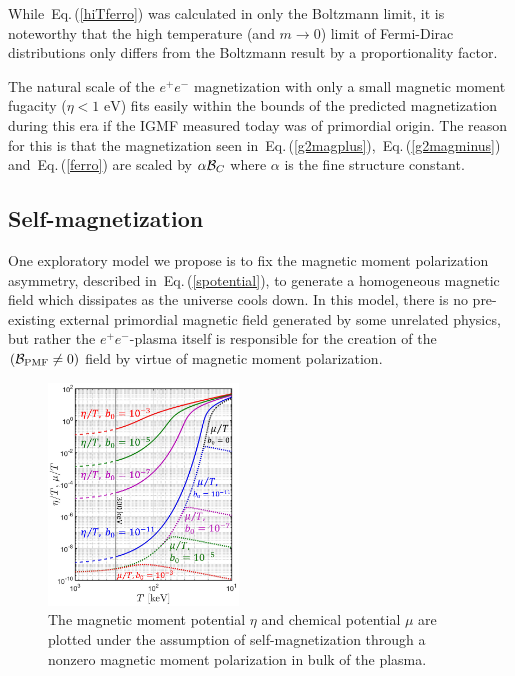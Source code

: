 \documentclass[aps,prd,floatfix,reprint]{revtex4-2}
\newcommand*{\eV}{\text{ eV}}
\newcommand{\req}[1]{Eq.\,(\ref{#1})}
\begin{document}
While~\req{hiTferro} was calculated in only the Boltzmann limit, it is noteworthy that the high temperature (and $m\rightarrow0$) limit of Fermi-Dirac distributions only differs from the Boltzmann result by a proportionality factor. 

The natural scale of the $e^{+}e^{-}$ magnetization with only a small magnetic moment fugacity ($\eta<1\eV$) fits easily within the bounds of the predicted magnetization during this era if the IGMF measured today was of primordial origin. The reason for this is that the magnetization seen in~\req{g2magplus},~\req{g2magminus} and~\req{ferro} are scaled by $\alpha{\cal B}_{C}$ where $\alpha$ is the fine structure constant.

\subsection{Self-magnetization}
\label{sec:self}
\noindent One exploratory model we propose is to fix the magnetic moment polarization asymmetry, described in~\req{spotential}, to generate a homogeneous magnetic field which dissipates as the universe cools down. In this model, there is no pre-existing external primordial magnetic field generated by some unrelated physics, but rather the $e^{+}e^{-}$-plasma itself is responsible for the creation of the $({\cal B}_{\rm PMF}\ne 0)$ field by virtue of magnetic moment polarization. 

\begin{figure}[ht]
 \centering
 \includegraphics[width=0.45\textwidth]{plots/Spinchemical_03.png}
 \caption{The magnetic moment potential $\eta$ and chemical potential $\mu$ are plotted under the assumption of self-magnetization through a nonzero magnetic moment polarization in bulk of the plasma.}
 \label{fig:self} 
\end{figure}
\end{document}

